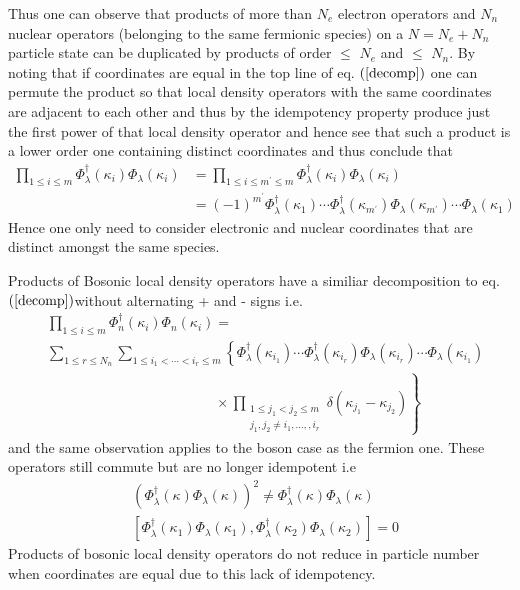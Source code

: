 \documentclass[aps,preprint]{revtex4}%
\begin{document}
Thus one can observe that products of more than $N_{e}$ electron operators and
$N_{n}$ nuclear operators (belonging to the same fermionic species) on a
$N=N_{e}+N_{n}$ particle state can be duplicated by products of order $\leq$
$N_{e}$ and $\leq$ $N_{n}$. By noting that if coordinates are equal in the top
line of eq. $\left(  \ref{decomp}\right)  $ one can permute the product so
that local density operators with the same coordinates are adjacent to each
other and thus by the idempotency property produce just the first power of
that local density operator and hence see that such a product is a lower order
one containing distinct coordinates and thus conclude that
\begin{align}
\prod_{1\leq i\leq m}\Phi_{\mathcal{\lambda}}^{\dagger}(\kappa_{i}%
)\Phi_{\mathcal{\lambda}}(\kappa_{i})  &  =\prod_{1\leq i\leq m^{\prime}\leq
m}\Phi_{\mathcal{\lambda}}^{\dagger}(\kappa_{i})\Phi_{\mathcal{\lambda}%
}(\kappa_{i})\nonumber\\
&  =\left(  -1\right)  ^{m^{\prime}}\Phi_{\mathcal{\lambda}}^{\dagger}%
(\kappa_{1})\cdots\Phi_{\mathcal{\lambda}}^{\dagger}(\kappa_{m^{\prime}}%
)\Phi_{\mathcal{\lambda}}(\kappa_{m^{\prime}})\cdots\Phi_{\mathcal{\lambda}%
}(\kappa_{1})
\end{align}
Hence one only need to consider electronic and nuclear coordinates that are
distinct amongst the same species.

Products of Bosonic local density operators have a similiar decomposition to
eq. $\left(  \ref{decomp}\right)  $without alternating + and - signs i.e.
\begin{align}
&  \prod_{1\leq i\leq m}\Phi_{n}^{\dagger}(\kappa_{i})\Phi_{n}(\kappa_{i})=\\
&  \sum_{1\leq r\leq N_{n}}\sum_{1\leq i_{1}<\cdots<i_{r}\leq m}\left\{
\Phi_{\mathcal{\lambda}}^{\dagger}(\kappa_{i_{1}})\cdots\Phi_{\mathcal{\lambda
}}^{\dagger}(\kappa_{i_{r}})\Phi_{\mathcal{\lambda}}(\kappa_{i_{r}})\cdots
\Phi_{\mathcal{\lambda}}(\kappa_{i_{1}})\right. \\
&  \qquad\qquad\qquad\qquad\qquad\qquad\times\left.  \prod_{\substack{1\leq
j_{1}<j_{2}\leq m \\j_{1},j_{2}\neq i_{1},\ldots,,i_{r} }} \delta\left(
\kappa_{j_{1}}-\kappa_{j_{2}}\right)  \right\}
\end{align}
and the same observation applies to the boson case as the fermion one. These
operators still commute but are no longer idempotent i.e
\begin{align}
&  \left(  \Phi_{\lambda}^{\dagger}(\kappa)\Phi_{\lambda}(\kappa)\right)
^{2}\neq\Phi_{\lambda}^{\dagger}(\kappa)\Phi_{\lambda}(\kappa)\nonumber\\
&  \left[  \Phi_{\mathcal{\lambda}}^{\dagger}(\kappa_{1})\Phi
_{\mathcal{\lambda}}(\kappa_{1}),\Phi_{\mathcal{\lambda}}^{\dagger}(\kappa
_{2})\Phi_{\mathcal{\lambda}}(\kappa_{2})\right]  =0
\end{align}
Products of bosonic local density operators do not reduce in particle number
when coordinates are equal due to this lack of idempotency.
\end{document}
